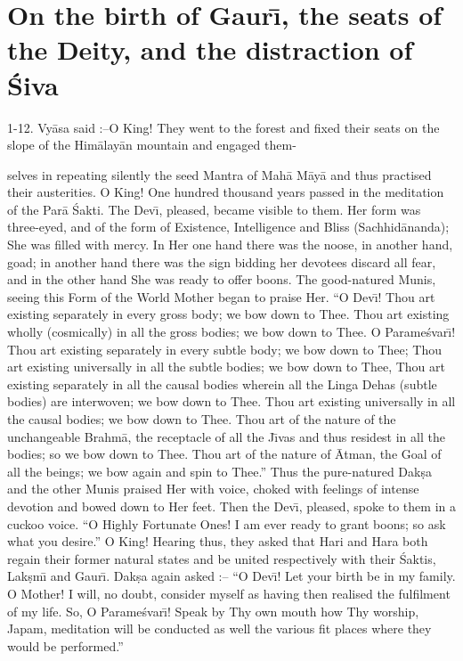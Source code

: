 \chapter{On the birth of Gaur\={\i}, the seats of the Deity, and the distraction of \'Siva}

1-12. Vy\=asa said :--O King! They went to the forest and fixed their seats on the slope of the Him\=alay\=an mountain and engaged them-

selves in repeating silently the seed Mantra of Mah\=a M\=ay\=a and thus practised their austerities. O King! One hundred thousand years passed in the meditation of the Par\=a \'Sakti. The Dev\={\i}, pleased, became visible to them. Her form was three-eyed, and of the form of Existence, Intelligence and Bliss (Sachhid\=ananda); She was filled with mercy. In Her one hand there was the noose, in another hand, goad; in another hand there was the sign bidding her devotees discard all fear, and in the other hand She was ready to offer boons. The good-natured Munis, seeing this Form of the World Mother began to praise Her. ``O Dev\={\i}! Thou art existing separately in every gross body; we bow down to Thee. Thou art existing wholly (cosmically) in all the gross bodies; we bow down to Thee. O Parame\'svar\={\i}! Thou art existing separately in every subtle body; we bow down to Thee; Thou art existing universally in all the subtle bodies; we bow down to Thee, Thou art existing separately in all the causal bodies wherein all the Linga Dehas (subtle bodies) are interwoven; we bow down to Thee. Thou art existing universally in all the causal bodies; we bow down to Thee. Thou art of the nature of the unchangeable Brahm\=a, the receptacle of all the J\={\i}vas and thus residest in all the bodies; so we bow down to Thee. Thou art of the nature of \=Atman, the Goal of all the beings; we bow again and spin to Thee.'' Thus the pure-natured Dak\d{s}a and the other Munis praised Her with voice, choked with feelings of intense devotion and bowed down to Her feet. Then the Dev\={\i}, pleased, spoke to them in a cuckoo voice. ``O Highly Fortunate Ones! I am ever ready to grant boons; so ask what you desire.'' O King! Hearing thus, they asked that Hari and Hara both regain their former natural states and be united respectively with their \'Saktis, Lak\d{s}m\={\i} and Gaur\={\i}. Dak\d{s}a again asked :-- ``O Dev\={\i}! Let your birth be in my family. O Mother! I will, no doubt, consider myself as having then realised the fulfilment of my life. So, O Parame\'svar\={\i}! Speak by Thy own mouth how Thy worship, Japam, meditation will be conducted as well the various fit places where they would be performed.''

